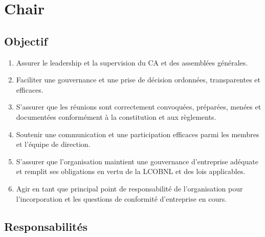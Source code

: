 \section{Chair}
\label{chair}

\subsection{Objectif}
\label{chair-objectif}

\begin{enumerate}
 \item Assurer le leadership et la supervision du CA et des assemblées générales.
 \item Faciliter une gouvernance et une prise de décision ordonnées, transparentes et efficaces.
 \item S'assurer que les réunions sont correctement convoquées, préparées, menées et documentées conformément à la constitution et aux règlements.
 \item Soutenir une communication et une participation efficaces parmi les membres et l'équipe de direction.
 \item S'assurer que l'organisation maintient une gouvernance d'entreprise adéquate et remplit ses obligations en vertu de la LCOBNL et des lois applicables.
 \item Agir en tant que principal point de responsabilité de l'organisation pour l'incorporation et les questions de conformité d'entreprise en cours.
\end{enumerate}

\subsection{Responsabilités}
\label{chair-responsabilites}

